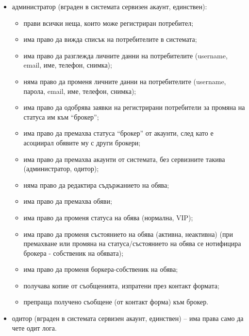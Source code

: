 \documentclass[]{article}
\begin{document}
\begin{enumerate}[I.]
{\begin{itemize}
{\begin{itemize}
		\item вижда контактната информация за собствениците на имотите в  обявите (както собствени, така и на други брокери);
		\item има право да вижда данни на даден потребител (username, email, име, телефон, снимка).
		\end{itemize}
	}
	\item {администратор (вграден в системата сервизен акаунт, единствен):
		\begin{itemize}
		\item прави всички неща, които може регистриран потребител;
		\item има право да вижда списък на потребителите в системата;
		\item има право да разглежда личните данни на потребителите (username, email, име, телефон, снимка);
		\item няма право да променя личните данни на потребителите (username, парола, email, име, телефон, снимка);
		\item има право да одобрява заявки на регистрирани потребители за промяна на статуса им към ``брокер'';
		\item има право да премахва статуса ``брокер'' от акаунти, след като е асоциирал обявите му с други брокери;
		\item има право да премахва акаунти от системата, без сервизните такива (администратор, одитор);
		\item няма право да редактира съдържанието на обява;
		\item има право да премахва обяви;
		\item има право да променя статуса на обява (нормална, VIP);
		\item има право да променя състоянието на обява (активна, неактивна) (при премахване или промяна на статуса/състоянието на обява се нотифицира брокера - собственик на обявата);
		\item има право да променя боркера-собственик на обява;
		\item получава копие от съобщенията, изпратени през контакт формата;
		\item препраща получено съобщене (от контакт форма) към брокер.
		\end{itemize}
	}
	\item одитор (вграден в системата сервизен акаунт, единствен) -- има права само да чете одит лога.
	\end{itemize}


}
\end{enumerate}
\end{document}
